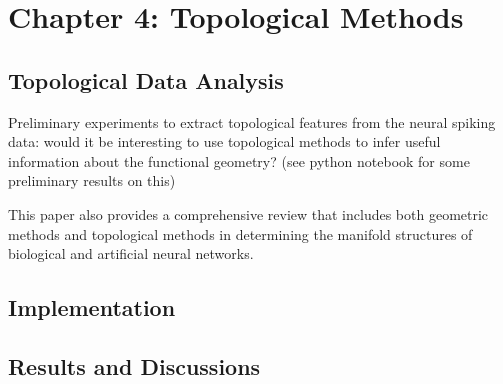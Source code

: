 \chapter{Chapter 4: Topological Methods}
\label{Chapter3} 

\section{Topological Data Analysis}
    
    Preliminary experiments to extract topological features from the neural spiking data: would it be interesting to use topological methods to infer useful information about the functional geometry? (see python notebook for some preliminary results on this)
    
    This paper \cite{chung_neural_2021} also provides a comprehensive review that includes both geometric methods and topological methods in determining the manifold structures of biological and artificial neural networks.

\section{Implementation}

\section{Results and Discussions}